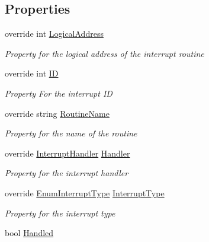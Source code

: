 \subsection*{Properties}
\begin{DoxyCompactItemize}
\item 
override int \hyperlink{class_c_p_u___o_s___simulator_1_1_c_p_u_1_1_interrupts_1_1_polled_interrupt_af3f35e5d2e388f4dce7929b1d2847c38}{Logical\+Address}
\begin{DoxyCompactList}\small\item\em Property for the logical address of the interrupt routine \end{DoxyCompactList}\item 
override int \hyperlink{class_c_p_u___o_s___simulator_1_1_c_p_u_1_1_interrupts_1_1_polled_interrupt_a4a58195bb680e89a88c1dad6168ae6ec}{I\+D}
\begin{DoxyCompactList}\small\item\em Property For the interrupt I\+D \end{DoxyCompactList}\item 
override string \hyperlink{class_c_p_u___o_s___simulator_1_1_c_p_u_1_1_interrupts_1_1_polled_interrupt_a62e236aa64f6ade8cb01192768bb75ba}{Routine\+Name}
\begin{DoxyCompactList}\small\item\em Property for the name of the routine \end{DoxyCompactList}\item 
override \hyperlink{class_c_p_u___o_s___simulator_1_1_c_p_u_1_1_interrupts_1_1_interrupt_handler}{Interrupt\+Handler} \hyperlink{class_c_p_u___o_s___simulator_1_1_c_p_u_1_1_interrupts_1_1_polled_interrupt_a7939b1f6c937f72347bce4d1697fca37}{Handler}
\begin{DoxyCompactList}\small\item\em Property for the interrupt handler \end{DoxyCompactList}\item 
override \hyperlink{namespace_c_p_u___o_s___simulator_1_1_c_p_u_1_1_interrupts_a575a43213ed6d54083da8956c5a69b39}{Enum\+Interrupt\+Type} \hyperlink{class_c_p_u___o_s___simulator_1_1_c_p_u_1_1_interrupts_1_1_polled_interrupt_a8e4b6a4a0f81b0480895ca7e0aa82e42}{Interrupt\+Type}
\begin{DoxyCompactList}\small\item\em Property for the interrupt type \end{DoxyCompactList}\item 
bool \hyperlink{class_c_p_u___o_s___simulator_1_1_c_p_u_1_1_interrupts_1_1_polled_interrupt_a59bc508dfe9758ed1e1da2262db1d3aa}{Handled}
\end{DoxyCompactItemize}
